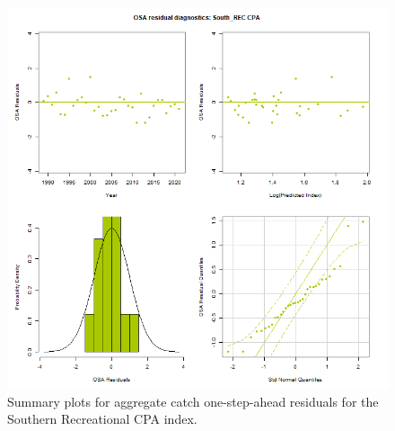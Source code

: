 \documentclass[
]{article}
\begin{document}
\begin{figure}

{\centering \includegraphics[width=1\linewidth]{../2023.RT.Runs/Run34/plots_png/diagnostics/OSA_resid_catch_4panel_South_REC_CPA} 

}

\caption{Summary plots for aggregate catch one-step-ahead residuals for the Southern Recreational CPA index.}\label{fig:osa-South-reccpa-catch-summ}
\end{figure}
\end{document}
